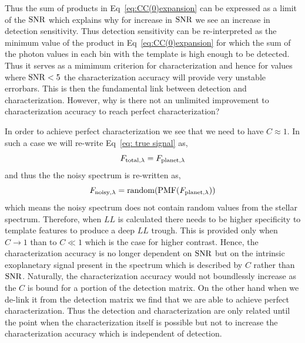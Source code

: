 Thus the sum of products in Eq~\ref{eq:CC(0)expansion} can be expressed as a limit of the $\rm{SNR}$ which explains why for increase in $\rm{SNR}$ we see an increase in detection sensitivity.
Thus detection sensitivity can be re-interpreted as the minimum value of the product in Eq~\ref{eq:CC(0)expansion} for which the sum of the photon values in each bin with the template is high enough to be detected.
Thus it serves as a mimimum criterion for characterization and hence for values where $\rm{SNR}<5$ the characterization accuracy will provide very unstable errorbars.
This is then the fundamental link between detection and characterization.
However, why is there not an unlimited improvement to characterization accuracy to reach perfect characterization?

In order to achieve perfect characterization we see that we need to have $C\approx1$.
In such a case we will re-write Eq~\ref{eq: true signal} as,
\begin{equation}
    F_{\rm{total},\lambda} = F_{\rm{planet},\lambda}
\end{equation}
and thus the the noisy spectrum is re-written as,
\begin{equation}
    F_{\rm{noisy},\lambda} = \textrm{random}(\textrm{PMF}(F_{\rm{planet},\lambda}))
\end{equation}
which means the noisy spectrum does not contain random values from the stellar spectrum.
Therefore, when $LL$ is calculated there needs to be higher specificity to template features to produce a deep $LL$ trough. 
This is provided only when $C\to1$ than to $C\ll 1$ which is the case for higher contrast. 
Hence, the characterization accuracy is no longer dependent on $\rm{SNR}$ but on the intrinsic exoplanetary signal present in the spectrum which is described by $C$ rather than $\rm{SNR}$.
Naturally, the characterization accuracy would not boundlessly increase as the $C$ is bound for a portion of the detection matrix.
On the other hand when we de-link it from the detection matrix we find that we are able to achieve perfect characterization.
Thus the detection and characterization are only related until the point when the characterization itself is possible but not to increase the characterization accuracy which is independent of detection.

